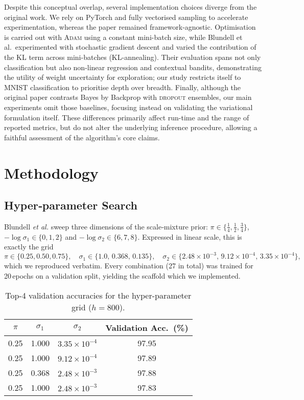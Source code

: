 \documentclass{article}
\begin{document}
Despite this conceptual overlap, several implementation choices diverge from the original work.  
We rely on PyTorch and fully vectorised sampling to accelerate experimentation, whereas the paper remained framework-agnostic.  
Optimisation is carried out with \textsc{Adam} using a constant mini-batch size, while Blundell et al.\ experimented with stochastic gradient descent and varied the contribution of the KL term across mini-batches (KL-annealing).  
Their evaluation spans not only classification but also non-linear regression and contextual bandits, demonstrating the utility of weight uncertainty for exploration; our study restricts itself to MNIST classification to prioritise depth over breadth.  
Finally, although the original paper contrasts Bayes by Backprop with \textsc{dropout} ensembles, our main experiments omit those baselines, focusing instead on validating the variational formulation itself.  
These differences primarily affect run-time and the range of reported metrics, but do not alter the underlying inference procedure, allowing a faithful assessment of the algorithm’s core claims.


\section{Methodology}

\subsection{Hyper‑parameter Search}

Blundell \textit{et al.} sweep three dimensions of the scale‑mixture prior: $\pi\!\in\!\{ \tfrac14,\tfrac12,\tfrac34\}$, $-\!\log\sigma_1\!\in\!\{0,1,2\}$ and $-\!\log\sigma_2\!\in\!\{6,7,8\}$.  
Expressed in linear scale, this is exactly the grid
\[
\pi\in\{0.25,0.50,0.75\},\quad
\sigma_1\in\{1.0,\,0.368,\,0.135\},\quad
\sigma_2\in\{2.48\!\times\!10^{-3},\,9.12\!\times\!10^{-4},\,3.35\!\times\!10^{-4}\},
\]
which we reproduced verbatim.  
Every combination (27 in total) was trained for 20\,epochs on a validation split, yielding the scaffold which we implemented. 
\begin{table}[h]
\centering
\caption{Top-4 validation accuracies for the hyper-parameter grid ($h=800$).} 
\label{tab:hp}
\begin{tabular}{cccc}
\toprule
$\pi$ & $\sigma_1$ & $\sigma_2$ & Validation Acc.\ (\%) \\
\midrule
0.25 & 1.000 & $3.35\times10^{-4}$ & 97.95 \\
0.25 & 1.000 & $9.12\times10^{-4}$ & 97.89 \\
0.25 & 0.368 & $2.48\times10^{-3}$ & 97.88 \\
0.25 & 1.000 & $2.48\times10^{-3}$ & 97.83 \\
\bottomrule
\end{tabular}
\end{table}
\end{document}

